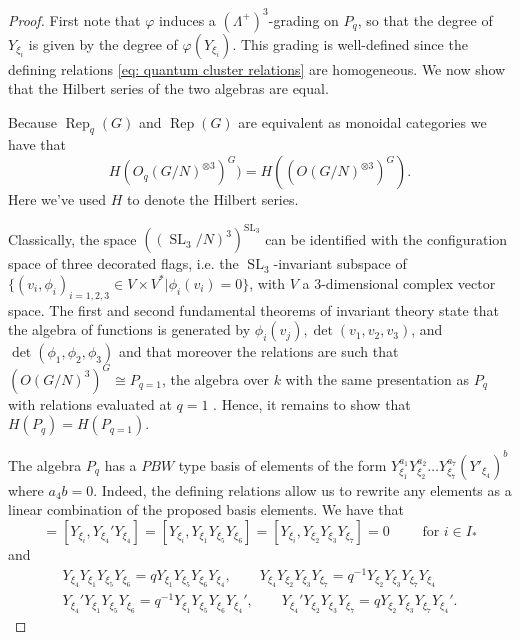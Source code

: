 \documentclass[a4paper]{article}
\numberwithin{equation}{section}
\newcommand{\1}{{\mathrm{1}\mkern-4mu{\mathchoice{}{}{\mskip-0.5mu}{\mskip-1mu}}\mathrm{l}}}
\DeclareMathOperator{\Rep}{Rep}
\DeclareMathOperator{\SL}{SL}
\begin{document}
\begin{proof}
First note that $\varphi$ induces a $(\Lambda^+)^3$-grading on $P_q$, so that the degree of $Y_{\xi_i}$ is given by the degree of $\varphi(Y_{\xi_i})$.
This grading is well-defined since the defining relations \eqref{eq: quantum cluster relations} are homogeneous. We now show that the Hilbert series of the two algebras are equal.

Because $\Rep_q(G)$ and $\Rep(G)$ are equivalent as monoidal categories we have that
\begin{equation}
    {H(O_q(G/N)^{\otimes 3})^G) = H((O(G/N)^{\otimes 3})^G)}.
\end{equation}
Here we've used $H$ to denote the Hilbert series.

Classically, the space $((\SL_3/N)^3)^{\SL_3}$ can be identified with the configuration space of three decorated flags, i.e. the $\SL_3$-invariant subspace of $\{(v_i,\phi_i)_{i=1,2,3} \in V \times V^*| \phi_i(v_i) = 0\}$, with $V$ a $3$-dimensional complex vector space. The first and second fundamental theorems of invariant theory \cite{weyl1939classical} state that the algebra of functions is generated by $\phi_i(v_j), \det(v_1,v_2,v_3)$, and $\det(\phi_1,\phi_2,\phi_3)$ and that moreover the relations are such that $(O(G/N)^3)^G \cong P_{q=1}$, the algebra over $k$ with the same presentation as $P_q$ with relations evaluated at $q=1$ . Hence, it remains to show that $H(P_q) = H(P_{q=1})$.

The algebra $P_q$ has a $PBW$ type basis of elements of the form $Y_{\xi_1}^{a_1}Y_{\xi_2}^{a_2}\ldots Y_{\xi_7}^{a_7}(Y'_{\xi_4})^b$ where $a_4b =0$. Indeed, the defining relations allow us to rewrite any elements as a linear combination of the proposed basis elements. We have that 
\begin{equation}
    [Y_{\xi_i}, Y_{\xi_4}Y_{\xi_4}'] = [Y_{\xi_i},Y_{\xi_4}'Y_{\xi_4}] =[Y_{\xi_i},Y_{\xi_1}Y_{\xi_5}Y_{\xi_6}] =[Y_{\xi_i},Y_{\xi_2}Y_{\xi_3}Y_{\xi_7}] = 0 \qquad \text{ for } i \in I_*
\end{equation}
and
\begin{equation}
\begin{aligned}
    Y_{\xi_4}Y_{\xi_1}Y_{\xi_5}Y_{\xi_6} = qY_{\xi_1}Y_{\xi_5}Y_{\xi_6}Y_{\xi_4},  \qquad Y_{\xi_4}Y_{\xi_2}Y_{\xi_3}Y_{\xi_7}= q^{-1}Y_{\xi_2}Y_{\xi_3}Y_{\xi_7}Y_{\xi_4}\\
    Y_{\xi_4}'Y_{\xi_1}Y_{\xi_5}Y_{\xi_6} = q^{-1}Y_{\xi_1}Y_{\xi_5}Y_{\xi_6}Y_{\xi_4}',  \qquad Y_{\xi_4}'Y_{\xi_2}Y_{\xi_3}Y_{\xi_7}= qY_{\xi_2}Y_{\xi_3}Y_{\xi_7}Y_{\xi_4}'.
\end{aligned}    
\end{equation}


\end{proof}
\end{document}
